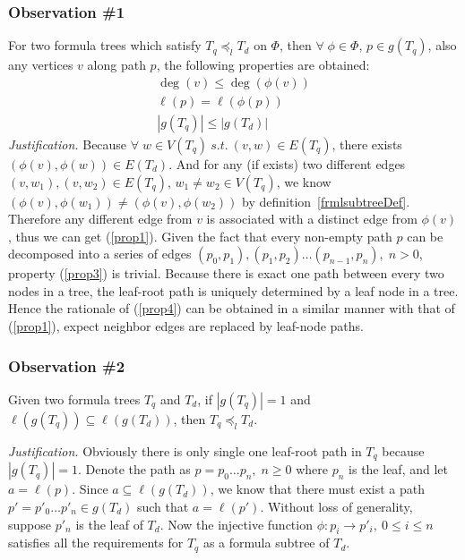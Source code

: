 \subsubsection*{Observation \#1} 
For two formula trees which satisfy $T_q \preceq_l T_d$ on $\Phi$, then $\forall\; \phi \in \Phi,\, p \in g(T_q)$, also any vertices $v$ along path $p$, the following properties are obtained:
\begin{eqnarray}
\deg(v) \le \deg(\phi(v)) \label{prop1} \\
\ell(p) = \ell(\phi(p)) \label{prop3} \\
\left| g(T_q) \right| \le \left| g(T_d) \right| \label{prop4}
\end{eqnarray}
\textit{Justification.} 
Because $\forall\; w \in V(T_q) \  s.t. \  (v, w) \in E(T_q)$, there exists $(\phi(v), \phi(w)) \in E(T_d)$. 
And for any (if exists) two different edges $(v, w_1), (v, w_2) \in E(T_q),\, w_1 \not= w_2 \in V(T_q) $, we know $(\phi(v), \phi(w_1)) \not= (\phi(v), \phi(w_2))$ by definition~\ref{frmlsubtreeDef}. 
Therefore any different edge from $v$ is associated with a distinct edge from $\phi(v)$, thus we can get (\ref{prop1}). 
Given the fact that every non-empty path $p$ can be decomposed into a series of edges $(p_0, p_1), (p_1, p_2) \ldots (p_{n-1}, p_n), \; n > 0$,
property (\ref{prop3}) is trivial.
Because there is exact one path between every two nodes in a tree, the leaf-root path is uniquely determined by a leaf node in a tree. Hence the rationale of (\ref{prop4}) can be obtained in a similar manner with that of (\ref{prop1}), expect neighbor edges are replaced by leaf-node paths.


\subsubsection*{Observation \#2} 
Given two formula trees $T_q$ and $T_d$, if $\left| g(T_q) \right| = 1$ and $\ell(g(T_{q})) \subseteq \ell(g(T_d))$, then $T_q \preceq_l T_d$.

\noindent \textit{Justification.} 
Obviously there is only single one leaf-root path in $T_q$ because $\left| g(T_q) \right| = 1$. 
Denote the path as $p = p_0 \ldots p_n,\; n \ge 0$ where $p_n$ is the leaf, and let $a = \ell(p)$.
Since $a \subseteq \ell(g(T_d))$, we know that there must exist a path $p'=p'_0 \ldots p'_n \in g(T_d)$ such that $a = \ell(p')$.
Without loss of generality, suppose $p'_n$ is the leaf of $T_d$. 
Now the injective function $\phi: p_i \rightarrow p'_i,\  0 \le i \le n$ satisfies all the requirements for $T_q$ as a formula subtree of $T_d$.

